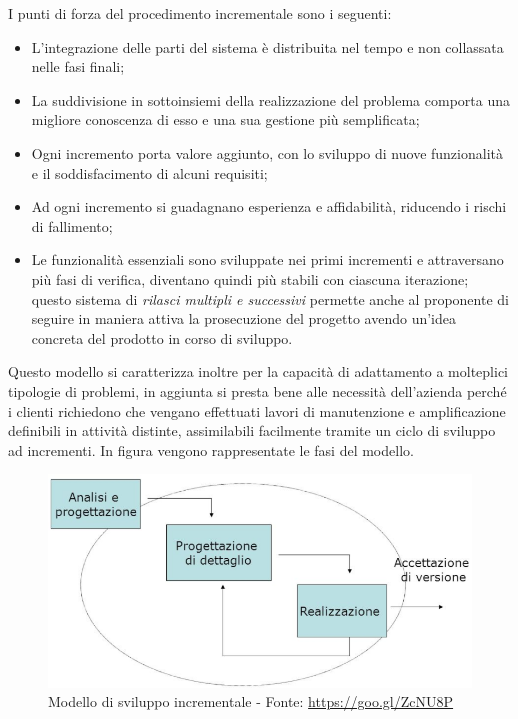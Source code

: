 	I punti di forza del procedimento incrementale sono i seguenti:
	\begin{itemize}
		\item L'integrazione delle parti del sistema è distribuita nel tempo e non collassata nelle fasi finali;
		\item La suddivisione in sottoinsiemi della realizzazione del problema comporta una migliore conoscenza di esso e una sua gestione più semplificata;
		\item Ogni incremento porta valore aggiunto, con lo sviluppo di nuove funzionalità e il soddisfacimento di alcuni requisiti;
		\item Ad ogni incremento si guadagnano esperienza e affidabilità, riducendo i rischi di fallimento;
		\item Le funzionalità essenziali sono sviluppate nei primi incrementi e attraversano più fasi di verifica, diventano quindi più stabili con ciascuna iterazione; questo sistema di \textit{rilasci multipli e successivi} permette anche al proponente di seguire in maniera attiva la prosecuzione del progetto avendo un'idea concreta del prodotto in corso di sviluppo.
	\end{itemize}
	
	 Questo modello si caratterizza inoltre per la capacità di adattamento a molteplici tipologie di problemi, in aggiunta si presta bene alle necessità dell'azienda perché i clienti richiedono che vengano effettuati lavori di manutenzione e amplificazione definibili in attività distinte, assimilabili facilmente tramite un ciclo di sviluppo ad incrementi. In figura vengono rappresentate le fasi del modello.\\
	
	\begin{figure}[H]
		\centering
	   	\includegraphics[width=1\textwidth]{immagini/ModelloIncrementale}
	   	\caption{Modello di sviluppo incrementale - Fonte: \url{https://goo.gl/ZcNU8P}}
	\end{figure}
	
